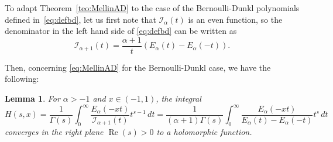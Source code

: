 \documentclass[a4paper]{amsart}
\newcommand{\I}{\mathcal{I}}
\newcommand{\Ea}{E_{\alpha}}
\renewcommand{\Re}{\operatorname{Re}}
\theoremstyle{plain}
\newtheorem{lemma}[theorem]{Lemma}
\theoremstyle{definition}
\theoremstyle{remark}
\numberwithin{equation}{section}
\begin{document}
To adapt Theorem~\ref{teo:MellinAD} to the case of the Bernoulli-Dunkl polynomials defined in~\eqref{eq:defbd}, let us first note that $\I_\alpha(t)$ is an even function, so the denominator in the left hand side of \eqref{eq:defbd} can be written as 
\begin{equation}
\label{eq:IEE}
\I_{\alpha+1}(t) = \frac{\alpha+1}{t}(\Ea(t)-\Ea(-t)).
\end{equation}

Then, concerning \eqref{eq:MellinAD} for the Bernoulli-Dunkl case, we have the following:

\begin{lemma}
\label{lem:Mellin-BD}
For $\alpha>-1$ and $x \in (-1,1)$, the integral
\[
    H(s,x) = \frac{1}{\Gamma(s)} 
    \int_{0}^{\infty} \frac{\Ea(-xt)}{\I_{\alpha+1}(t)} t^{s-1}\,dt
    = \frac{1}{(\alpha+1)\Gamma(s)}
    \int_{0}^{\infty} \frac{\Ea(-xt)}{\Ea(t)-\Ea(-t)} t^{s}\,dt
\]
converges in the right plane $\Re(s) > 0$ to a holomorphic function.
\end{lemma}
\end{document}

